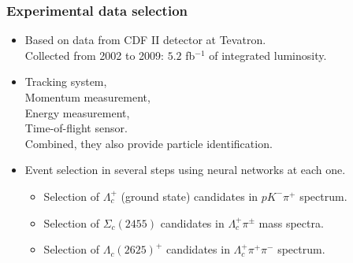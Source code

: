 \documentclass[10pt]{beamer}
\begin{document}
\begin{frame}[label=events]%
  \frametitle{Experimental data selection}

  \begin{itemize}
    \item Based on data from CDF II detector at Tevatron.
      \\ Collected from 2002 to 2009: $5.2$ fb$^{-1}$ of integrated 
      luminosity.
    \item Tracking system,
      \\ Momentum measurement,
      \\ Energy measurement,
      \\ Time-of-flight sensor.
      \\ Combined, they also provide particle identification.
    \item Event selection in several steps using neural networks at each 
      one.
      \begin{itemize}
        \item Selection of $\Lambda_c^+$ (ground state) candidates in 
          $pK^-\pi^+$ spectrum.
        \item Selection of $\Sigma_c(2455)$ candidates in 
          $\Lambda_c^+\pi^\pm$ mass spectra.
        \item Selection of $\Lambda_c(2625)^+$ candidates in 
          $\Lambda_c^+\pi^+\pi^-$ spectrum.
      \end{itemize}
  \end{itemize}
\end{frame}%
\end{document}
